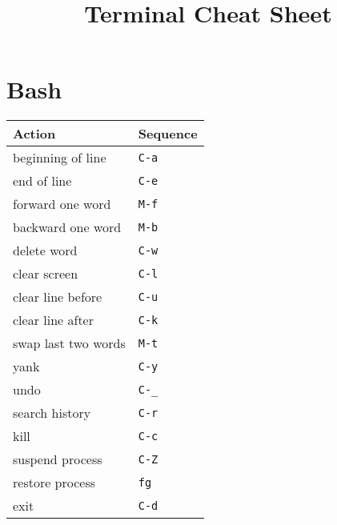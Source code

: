 \documentclass[report,twocolumn]{IEEEtran}
\begin{document}
\title{Terminal Cheat Sheet}



\maketitle

\section{Bash}
\begin{center}
\begin{tabular}{ l | l }
\hline
Action & Sequence\\
\hline
beginning of line & \texttt{C-a} \\
end of line & \texttt{C-e} \\
forward one word & \texttt{M-f} \\
backward one word & \texttt{M-b} \\
\hline
delete word & \texttt{C-w} \\
clear screen & \texttt{C-l} \\
clear line before& \texttt{C-u} \\
clear line after & \texttt{C-k} \\
swap last two words & \texttt{M-t} \\
yank & \texttt{C-y} \\
undo & \texttt{C-\_} \\
\hline
search history & \texttt{C-r} \\
kill & \texttt{C-c} \\
suspend process & \texttt{C-Z} \\
restore process & \texttt{fg} \\
exit & \texttt{C-d} \\
\hline
\end{tabular}
\end{center}
\end{document}

